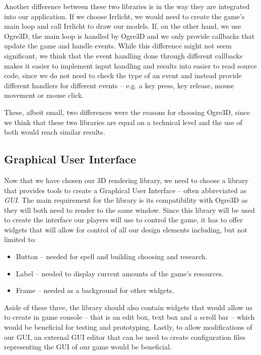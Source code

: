 Another difference between these two libraries is in the way they are integrated into our application. If we choose Irrlicht, we would need
to create the game's main loop and call Irrlicht to draw our models. If, on the other hand, we use Ogre3D, the main loop is handled by Ogre3D
and we only provide callbacks that update the game and handle events. While this difference might not seem significant, we think that
the event handling done through different callbacks makes it easier to implement input handling and results into easier to read source
code, since we do not need to check the type of an event and instead provide different handlers for different events -- e.g.
a key press, key release, mouse movement or mouse click.

These, albeit small, two differences were the reasons for choosing Ogre3D, since we think that these two libraries are equal
on a technical level and the use of both would reach similar results.

\subsection{Graphical User Interface}

Now that we have chosen our 3D rendering library, we need to choose a library that provides tools to create a Graphical User Interface 
-- often abbreviated as \emph{GUI}. The main requirement for the library is its compatibility with Ogre3D as they will both need to render
to the same window. Since this library will be used to create the interface our players will use to control the game,
it has to offer widgets that will allow for control of all our design elements including, but not limited to:

\begin{itemize}
    \item Button -- needed for spell and building choosing and research.
    \item Label -- needed to display current amounts of the game's resources.
    \item Frame -- needed as a background for other widgets.
\end{itemize}

Aside of these three, the library should also contain widgets that would allow us to create in game console -- that is an edit box, 
text box and a scroll bar -- which would be beneficial for testing and prototyping. Lastly, to allow modifications of our GUI, an external 
GUI editor that can be used to create configuration files representing the GUI of our game would be beneficial.

